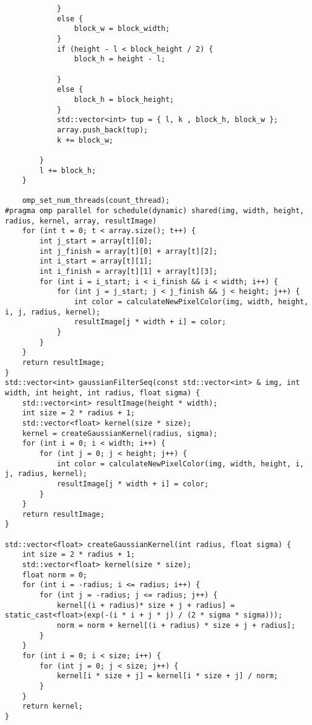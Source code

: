 \documentclass{report}
\begin{document}
\begin{lstlisting}
            }
            else {
                block_w = block_width;
            }
            if (height - l < block_height / 2) {
                block_h = height - l;

            }
            else {
                block_h = block_height;
            }
            std::vector<int> tup = { l, k , block_h, block_w };
            array.push_back(tup);
            k += block_w;

        }
        l += block_h;
    }

    omp_set_num_threads(count_thread);
#pragma omp parallel for schedule(dynamic) shared(img, width, height, radius, kernel, array, resultImage)
    for (int t = 0; t < array.size(); t++) {
        int j_start = array[t][0];
        int j_finish = array[t][0] + array[t][2];
        int i_start = array[t][1];
        int i_finish = array[t][1] + array[t][3];
        for (int i = i_start; i < i_finish && i < width; i++) {
            for (int j = j_start; j < j_finish && j < height; j++) {
                int color = calculateNewPixelColor(img, width, height, i, j, radius, kernel);
                resultImage[j * width + i] = color;
            }
        }
    }
    return resultImage;
}
std::vector<int> gaussianFilterSeq(const std::vector<int> & img, int width, int height, int radius, float sigma) {
    std::vector<int> resultImage(height * width);
    int size = 2 * radius + 1;
    std::vector<float> kernel(size * size);
    kernel = createGaussianKernel(radius, sigma);
    for (int i = 0; i < width; i++) {
        for (int j = 0; j < height; j++) {
            int color = calculateNewPixelColor(img, width, height, i, j, radius, kernel);
            resultImage[j * width + i] = color;
        }
    }
    return resultImage;
}

std::vector<float> createGaussianKernel(int radius, float sigma) {
    int size = 2 * radius + 1;
    std::vector<float> kernel(size * size);
    float norm = 0;
    for (int i = -radius; i <= radius; i++) {
        for (int j = -radius; j <= radius; j++) {
            kernel[(i + radius)* size + j + radius] = static_cast<float>(exp(-(i * i + j * j) / (2 * sigma * sigma)));
            norm = norm + kernel[(i + radius) * size + j + radius];
        }
    }
    for (int i = 0; i < size; i++) {
        for (int j = 0; j < size; j++) {
            kernel[i * size + j] = kernel[i * size + j] / norm;
        }
    }
    return kernel;
}


\end{lstlisting}
\end{document}
